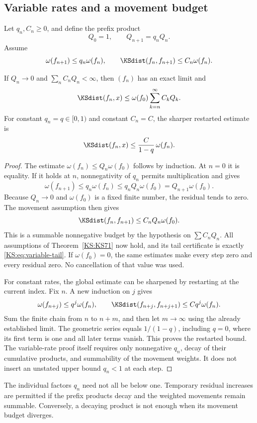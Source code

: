 \subsection{Variable rates and a movement budget}
Let \(q_n,C_n\ge0\), and define the prefix product
\[
 Q_0=1,\qquad Q_{n+1}=q_nQ_n.
\]
Assume
\begin{equation}\label{KS:eq:variable-rate}
 \omega(f_{n+1})\le q_n\omega(f_n),\qquad
 \KSdist(f_n,f_{n+1})\le C_n\omega(f_n).
\end{equation}

\begin{KStheorem}\label{KS:KS72}
If \(Q_n\to0\) and \(\sum_n C_nQ_n<\infty\), then \((f_n)\) has an exact limit and
\begin{equation}\label{KS:eq:variable-tail}
 \KSdist(f_n,x)\le\omega(f_0)\sum_{k=n}^{\infty}C_kQ_k.
\end{equation}
For constant \(q_n=q\in[0,1)\) and constant \(C_n=C\), the sharper restarted estimate is
\[
 \KSdist(f_n,x)\le\frac{C}{1-q}\,\omega(f_n).
\]
\end{KStheorem}
\begin{proof}
The estimate \(\omega(f_n)\le Q_n\omega(f_0)\) follows by induction. At \(n=0\) it is equality. If it holds at \(n\), nonnegativity of \(q_n\) permits multiplication and gives
\[
 \omega(f_{n+1})\le q_n\omega(f_n)
 \le q_nQ_n\omega(f_0)=Q_{n+1}\omega(f_0).
\]
Because \(Q_n\to0\) and \(\omega(f_0)\) is a fixed finite number, the residual tends to zero. The movement assumption then gives
\[
 \KSdist(f_n,f_{n+1})\le C_nQ_n\omega(f_0).
\]
This is a summable nonnegative budget by the hypothesis on \(\sum C_nQ_n\). All assumptions of Theorem~\ref{KS:KS71} now hold, and its tail certificate is exactly \eqref{KS:eq:variable-tail}. If \(\omega(f_0)=0\), the same estimates make every step zero and every residual zero. No cancellation of that value was used.

For constant rates, the global estimate can be sharpened by restarting at the current index. Fix \(n\). A new induction on \(j\) gives
\[
 \omega(f_{n+j})\le q^j\omega(f_n),\qquad
 \KSdist(f_{n+j},f_{n+j+1})\le Cq^j\omega(f_n).
\]
Sum the finite chain from \(n\) to \(n+m\), and then let \(m\to\infty\) using the already established limit. The geometric series equals \(1/(1-q)\), including \(q=0\), where its first term is one and all later terms vanish. This proves the restarted bound. The variable-rate proof itself requires only nonnegative \(q_n\), decay of their cumulative products, and summability of the movement weights. It does not insert an unstated upper bound \(q_n<1\) at each step.
\end{proof}
The individual factors \(q_n\) need not all be below one. Temporary residual increases are permitted if the prefix products decay and the weighted movements remain summable. Conversely, a decaying product is not enough when its movement budget diverges.

